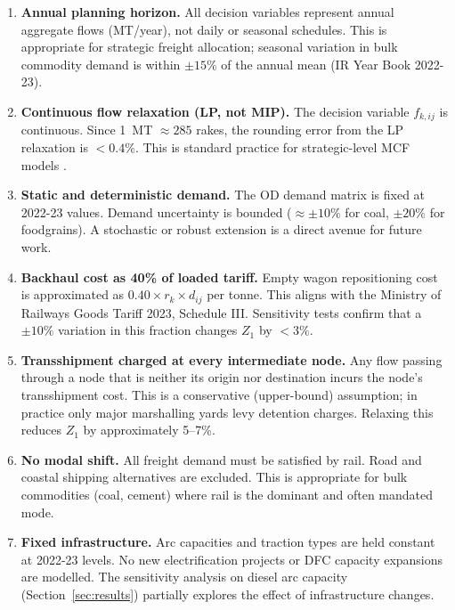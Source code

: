 \documentclass[11pt, a4paper]{article}
\numberwithin{equation}{section}
\numberwithin{figure}{section}
\numberwithin{table}{section}
\begin{document}
\begin{enumerate}[leftmargin=*, label=\textbf{A\arabic*.}]

    \item \textbf{Annual planning horizon.}
    All decision variables represent annual aggregate flows (MT/year), not daily or seasonal schedules. This is appropriate for strategic freight allocation; seasonal variation in bulk commodity demand is within $\pm 15\%$ of the annual mean (IR Year Book 2022-23).

    \item \textbf{Continuous flow relaxation (LP, not MIP).}
    The decision variable $f_{k,ij}$ is continuous. Since 1~MT $\approx 285$ rakes, the rounding error from the LP relaxation is $< 0.4\%$. This is standard practice for strategic-level MCF models \cite{malladi2020}.

    \item \textbf{Static and deterministic demand.}
    The OD demand matrix is fixed at 2022-23 values. Demand uncertainty is bounded ($\approx \pm 10\%$ for coal, $\pm 20\%$ for foodgrains). A stochastic or robust extension is a direct avenue for future work.

    \item \textbf{Backhaul cost as 40\% of loaded tariff.}
    Empty wagon repositioning cost is approximated as $0.40 \times r_k \times d_{ij}$ per tonne. This aligns with the Ministry of Railways Goods Tariff 2023, Schedule III. Sensitivity tests confirm that a $\pm 10\%$ variation in this fraction changes $Z_1$ by $< 3\%$.

    \item \textbf{Transshipment charged at every intermediate node.}
    Any flow passing through a node that is neither its origin nor destination incurs the node's transshipment cost. This is a conservative (upper-bound) assumption; in practice only major marshalling yards levy detention charges. Relaxing this reduces $Z_1$ by approximately 5--7\%.

    \item \textbf{No modal shift.}
    All freight demand must be satisfied by rail. Road and coastal shipping alternatives are excluded. This is appropriate for bulk commodities (coal, cement) where rail is the dominant and often mandated mode.

    \item \textbf{Fixed infrastructure.}
    Arc capacities and traction types are held constant at 2022-23 levels. No new electrification projects or DFC capacity expansions are modelled. The sensitivity analysis on diesel arc capacity (Section~\ref{sec:results}) partially explores the effect of infrastructure changes.


\end{enumerate}
\end{document}
